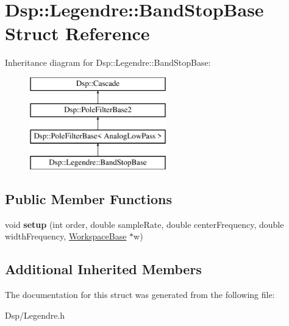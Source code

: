 \hypertarget{structDsp_1_1Legendre_1_1BandStopBase}{\section{Dsp\-:\-:Legendre\-:\-:Band\-Stop\-Base Struct Reference}
\label{structDsp_1_1Legendre_1_1BandStopBase}
}
Inheritance diagram for Dsp\-:\-:Legendre\-:\-:Band\-Stop\-Base\-:\begin{figure}[H]
\begin{center}
\leavevmode
\includegraphics[height=4.000000cm]{structDsp_1_1Legendre_1_1BandStopBase}
\end{center}
\end{figure}
\subsection*{Public Member Functions}
\begin{DoxyCompactItemize}
\item 
\hypertarget{structDsp_1_1Legendre_1_1BandStopBase_ab7446067ae33280f1c940d41753f509a}{void {\bfseries setup} (int order, double sample\-Rate, double center\-Frequency, double width\-Frequency, \hyperlink{structDsp_1_1Legendre_1_1WorkspaceBase}{Workspace\-Base} $\ast$w)}\label{structDsp_1_1Legendre_1_1BandStopBase_ab7446067ae33280f1c940d41753f509a}

\end{DoxyCompactItemize}
\subsection*{Additional Inherited Members}


The documentation for this struct was generated from the following file\-:\begin{DoxyCompactItemize}
\item 
Dsp/Legendre.\-h\end{DoxyCompactItemize}
